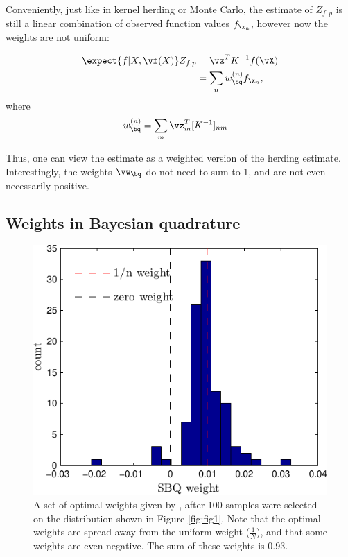 Conveniently, just like in kernel herding or Monte Carlo, the estimate of $Z_{f,p}$ is still a linear combination of observed function values $f_{\x_n}$, however now the weights are not uniform:

\begin{align}
	\expect{f\vert X,\vf(X)} Z_{f,p} & = \vz^T K^{-1} f(\vX) \\
		& = \sum_n w_{\bq}^{(n)} f_{\x_n},
\end{align}  
where 
\begin{align}  
	w_{\bq}^{(n)} & = \sum_m \vz_m^T [K^{-1}]_{nm}
	\label{eq:bq_weights}
\end{align}

Thus, one can view the \bq{} estimate as a weighted version of the herding estimate. Interestingly, the weights $\vw_{\bq}$ do not need to sum to 1, and are not even necessarily positive.

\subsection{Weights in Bayesian quadrature}

\begin{figure}
	\centering
	\includegraphics[width=\columnwidth]{figs/herding/weights_v1_n100}
	\caption[Empirical distribution of weights in sequential Bayesian quadrature]{A set of optimal weights given by \bq{}, after 100 \sbq{} samples were selected on the distribution shown in Figure \ref{fig:fig1}. Note that the optimal weights are spread away from the uniform weight ($\frac{1}{N}$), and that some weights are even negative. The sum of these weights is 0.93.}
	\label{fig:weights100}
\end{figure}


